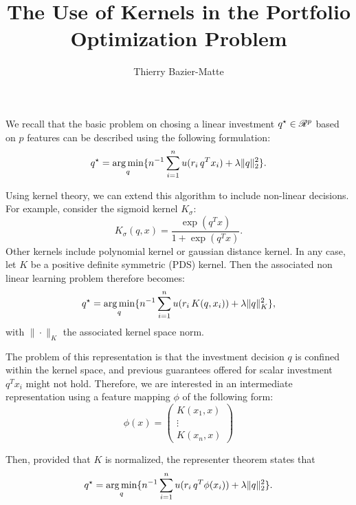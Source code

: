 \documentclass{article}
\title{The Use of Kernels in the Portfolio Optimization Problem}
\author{Thierry Bazier-Matte}
\begin{document}
\maketitle

We recall that the basic problem on chosing a linear investment $q^\star\in\mathscr{R}^p$ based on $p$
features can be described using the following formulation:
\[
  q^\star = \operatorname*{arg\,min}_q\{ n^{-1} \sum_{i=1}^n u(r_i\,q^Tx_i) + \lambda\|q\|^2_2\}.
\]

Using kernel theory, we can extend this algorithm to include non-linear decisions. For
example, consider the sigmoid kernel $K_\sigma$:
\[
  K_\sigma(q,x) = \frac{\exp(q^T x)}{1+\exp(q^Tx)}.
\]
Other kernels include \eg polynomial kernel or gaussian distance kernel. In any case, let
$K$ be a positive definite symmetric (PDS) kernel. Then the associated non linear learning
problem therefore becomes:
\[
  q^\star = \operatorname*{arg\,min}_q\{ n^{-1}\sum_{i=1}^n u(r_i\,K(q,x_i)) + \lambda\|q\|^2_K\},
\]
with $\|\cdot\|_K$ the associated kernel space norm. 

The problem of this representation is that the investment decision $q$ is confined within
the kernel space, and previous guarantees offered for scalar investment $q^Tx_i$ might not
hold. Therefore, we are interested in an intermediate representation using a feature
mapping $\phi$ of the following form:
\[
  \phi(x) =
  \begin{pmatrix}
    K(x_1,x)\\
    \vdots\\
    K(x_n,x)
  \end{pmatrix}
\]

Then, provided that $K$ is normalized, the representer theorem states that
\[
  q^\star = \operatorname*{arg\,min}_q\{n^{-1}\sum_{i=1}^n u(r_i\,q^T\phi(x_i)) + \lambda\|q\|^2_2\}.
\]
\end{document}
